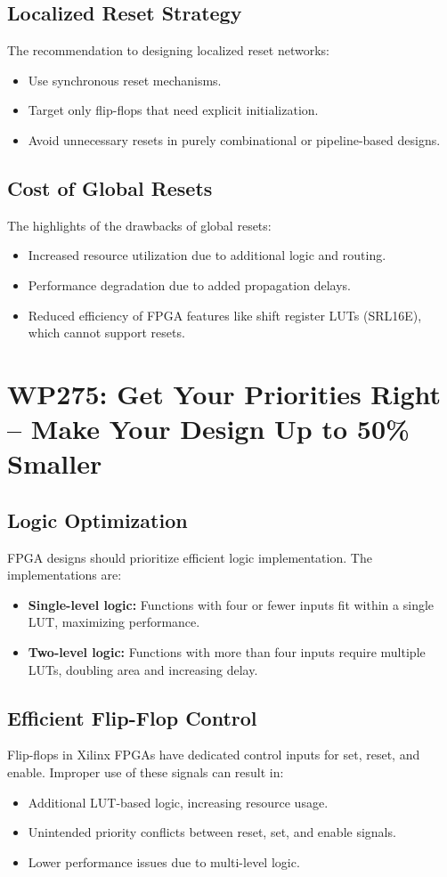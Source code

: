 \documentclass{article}
\begin{document}
	\subsection{Localized Reset Strategy}
	The recommendation to designing localized reset networks:
	\begin{itemize}
		\item Use synchronous reset mechanisms.
		\item Target only flip-flops that need explicit initialization.
		\item Avoid unnecessary resets in purely combinational or pipeline-based designs.
	\end{itemize}
	
	\subsection{Cost of Global Resets}
	The highlights of the drawbacks of global resets:
	\begin{itemize}
		\item Increased resource utilization due to additional logic and routing.
		\item Performance degradation due to added propagation delays.
		\item Reduced efficiency of FPGA features like shift register LUTs (SRL16E), which cannot support resets.
	\end{itemize}
	
	\section{WP275: Get Your Priorities Right – Make Your Design Up to 50\% Smaller}
	
	\subsection{Logic Optimization}
	FPGA designs should prioritize efficient logic implementation. The implementations are:
	\begin{itemize}
		\item \textbf{Single-level logic:} Functions with four or fewer inputs fit within a single LUT, maximizing performance.
		\item \textbf{Two-level logic:} Functions with more than four inputs require multiple LUTs, doubling area and increasing delay.
	\end{itemize}
	
	\subsection{Efficient Flip-Flop Control}
	Flip-flops in Xilinx FPGAs have dedicated control inputs for set, reset, and enable. Improper use of these signals can result in:
	\begin{itemize}
		\item Additional LUT-based logic, increasing resource usage.
		\item Unintended priority conflicts between reset, set, and enable signals.
		\item Lower performance issues due to multi-level logic.
	\end{itemize}
	
\end{document}
